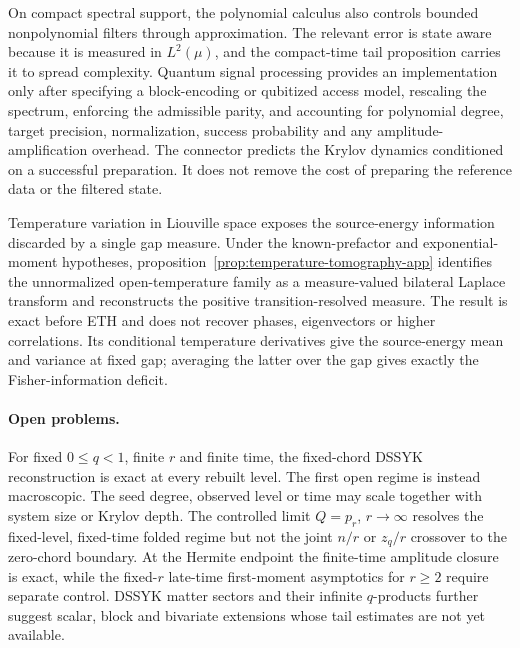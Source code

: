 \documentclass[a4paper,11pt]{article}
\theoremstyle{definition}
\theoremstyle{remark}
\begin{document}
On compact spectral support, the polynomial calculus also controls bounded nonpolynomial filters
through approximation.  The relevant error is state aware because it is measured in $L^2(\mu)$,
and the compact-time tail proposition  carries it to spread complexity.  Quantum signal processing
provides an implementation only after specifying a block-encoding or qubitized access model,
rescaling the spectrum, enforcing the admissible parity, and accounting for polynomial degree,
target precision, normalization, success probability and any amplitude-amplification overhead. The connector predicts the Krylov dynamics
conditioned on a successful preparation.  It does not remove the cost of preparing the reference
data or the filtered state.

Temperature variation in Liouville space exposes the source-energy information discarded by a
single gap measure.  Under the known-prefactor and exponential-moment hypotheses,
proposition~\ref{prop:temperature-tomography-app} identifies the unnormalized open-temperature
family as a measure-valued bilateral Laplace transform and reconstructs the positive
transition-resolved measure.  The result is exact before ETH and does not recover phases,
eigenvectors or higher correlations.  Its conditional temperature derivatives give the
source-energy mean and variance at fixed gap; averaging the latter over the gap gives exactly the
Fisher-information deficit.

\paragraph{Open problems.}
For fixed $0\le q<1$, finite $r$ and
finite time, the fixed-chord DSSYK reconstruction is exact at every rebuilt level.
The first open regime is instead macroscopic.  The seed degree, observed level or time may scale
together with system size or Krylov depth.  The controlled limit $Q=p_r$, $r\to\infty$ resolves
the fixed-level, fixed-time folded regime but not the joint $n/r$ or $z_q/r$ crossover to the
zero-chord boundary.  At
the Hermite endpoint the finite-time amplitude closure is exact, while the fixed-$r$ late-time
first-moment asymptotics for $r\ge2$ require separate control.  DSSYK matter sectors and their
infinite $q$-products further suggest scalar, block and bivariate extensions whose tail estimates
are not yet available.  
\end{document}
